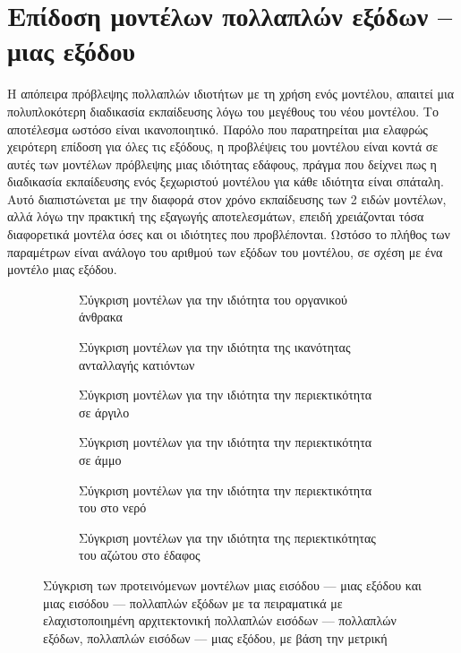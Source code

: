 \section{Επίδοση μοντέλων πολλαπλών εξόδων -- μιας εξόδου}
Η απόπειρα πρόβλεψης πολλαπλών ιδιοτήτων με τη χρήση ενός μοντέλου, απαιτεί μια πολυπλοκότερη διαδικασία εκπαίδευσης λόγω του μεγέθους του νέου μοντέλου. Το αποτέλεσμα ωστόσο είναι ικανοποιητικό. Παρόλο που παρατηρείται μια ελαφρώς χειρότερη επίδοση για όλες τις εξόδους, η προβλέψεις του μοντέλου είναι κοντά σε αυτές των μοντέλων πρόβλεψης μιας ιδιότητας εδάφους, πράγμα που δείχνει πως η διαδικασία εκπαίδευσης ενός ξεχωριστού μοντέλου για κάθε ιδιότητα είναι σπάταλη. Αυτό διαπιστώνεται με την διαφορά στον χρόνο εκπαίδευσης των 2 ειδών μοντέλων, αλλά λόγω την πρακτική της εξαγωγής αποτελεσμάτων, επειδή χρειάζονται τόσα διαφορετικά μοντέλα όσες και οι ιδιότητες που προβλέπονται. Ωστόσο το πλήθος των παραμέτρων είναι ανάλογο του αριθμού των εξόδων του μοντέλου, σε σχέση με ένα μοντέλο μιας εξόδου.

\begin{figure}[htbp]
    \begin{subfigure}{0.5\textwidth}
        
        \caption{Σύγκριση μοντέλων για την ιδιότητα του οργανικού άνθρακα}
        \label{fig:subim1}
    \end{subfigure}
    \begin{subfigure}{0.5\textwidth}
        
        \caption{Σύγκριση μοντέλων για την ιδιότητα της ικανότητας ανταλλαγής κατιόντων}
        \label{fig:subim2}
    \end{subfigure}
    \begin{subfigure}{0.5\textwidth}
        
        \caption{Σύγκριση μοντέλων για την ιδιότητα την περιεκτικότητα σε άργιλο}
        \label{fig:subim3}
    \end{subfigure}
    \begin{subfigure}{0.5\textwidth}
        
        \caption{Σύγκριση μοντέλων για την ιδιότητα την περιεκτικότητα σε άμμο}
        \label{fig:subim4}
    \end{subfigure}
    \begin{subfigure}{0.5\textwidth}
        
        \caption{Σύγκριση μοντέλων για την ιδιότητα την περιεκτικότητα του  στο νερό}
        \label{fig:subim5}
    \end{subfigure}
    \begin{subfigure}{0.5\textwidth}
        
        \caption{Σύγκριση μοντέλων για την ιδιότητα της περιεκτικότητας του αζώτου στο έδαφος}
        \label{fig:subim6}
    \end{subfigure}
    \caption{Σύγκριση των προτεινόμενων μοντέλων  μιας εισόδου --- μιας εξόδου και  μιας εισόδου --- πολλαπλών εξόδων με τα πειραματικά με ελαχιστοποιημένη αρχιτεκτονική  πολλαπλών εισόδων --- πολλαπλών εξόδων,  πολλαπλών εισόδων --- μιας εξόδου, με βάση την μετρική }
\end{figure}

